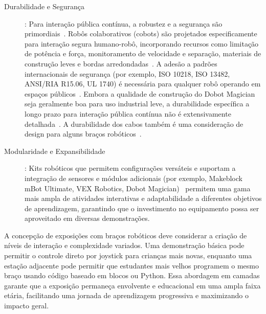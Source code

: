 \documentclass[%
  a4paper,%
  12pt,%
  fleqn,%
  english,%
  brazilian,%
]{article}
\begin{document}
\begin{description}
		\item [Durabilidade e Segurança]: Para interação pública contínua, a robustez e a segurança são primordiais~\cite{ross2024BeyondExhibits}. Robôs colaborativos (cobots) são projetados especificamente para interação segura humano-robô, incorporando recursos como limitação de potência e força, monitoramento de velocidade e separação, materiais de construção leves e bordas arredondadas~\cite{top3dshopDobotMagicianReview2023}. A adesão a padrões internacionais de segurança (por exemplo, ISO 10218, ISO 13482, ANSI/RIA R15.06, UL 1740) é necessária para qualquer robô operando em espaços públicos~\cite{standardBotsCobotSafetyStandards2025}. Embora a qualidade de construção do Dobot Magician seja geralmente boa para uso industrial leve, a durabilidade específica a longo prazo para interação pública contínua não é extensivamente detalhada~\cite{robotlabDobotClassroomPack2025}. A durabilidade dos cabos também é uma consideração de design para alguns braços robóticos~\cite{bostonDynamicsSpot2025}.
		\item [Modularidade e Expansibilidade]: Kits robóticos que permitem configurações versáteis e suportam a integração de sensores e módulos adicionais (por exemplo, Makeblock mBot Ultimate, VEX Robotics, Dobot Magician)~\cite{makeblockMBot22025} permitem uma gama mais ampla de atividades interativas e adaptabilidade a diferentes objetivos de aprendizagem, garantindo que o investimento no equipamento possa ser aproveitado em diversas demonstrações.
	\end{description}


A concepção de exposições com braços robóticos deve considerar a criação de níveis de interação e complexidade variados. Uma demonstração básica pode permitir o controle direto por joystick para crianças mais novas, enquanto uma estação adjacente pode permitir que estudantes mais velhos programem o mesmo braço usando código baseado em blocos ou Python. Essa abordagem em camadas garante que a exposição permaneça envolvente e educacional em uma ampla faixa etária, facilitando uma jornada de aprendizagem progressiva e maximizando o impacto geral.
\end{document}
